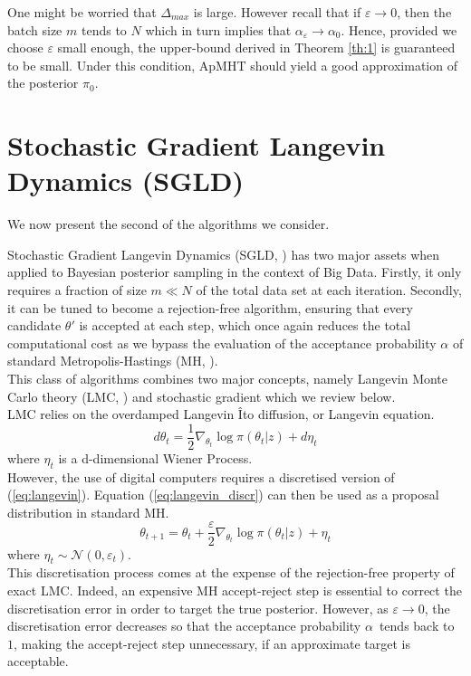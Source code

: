 \documentclass[11pt,a4paper]{report}\usepackage[]{graphicx}\usepackage[]{color}
\begin{document}
One might be worried that $\Delta_{max}$ is large. However recall that if $\varepsilon\rightarrow0$, then the batch size $m$ tends to $N$ which in turn implies that $\alpha_\varepsilon\rightarrow\alpha_0$. Hence, provided we choose $\varepsilon$ small enough, the upper-bound derived in Theorem \ref{th:1} is guaranteed to be small. Under this condition, ApMHT should yield a good approximation of the posterior $\pi_0$.
\newpage
\section{Stochastic Gradient Langevin Dynamics (SGLD)}
\label{sec:SGLD_exp}
We now present the second of the algorithms we consider.
\par Stochastic Gradient Langevin Dynamics (SGLD, \cite{welling2011bayesian}) has two major assets when applied to Bayesian posterior sampling in the context of Big Data. Firstly, it only requires a fraction of size $m\ll N$ of the total data set at each iteration. Secondly, it can be tuned to become a rejection-free algorithm, ensuring that every candidate $\theta'$ is accepted at each step, which once again reduces the total computational cost as we bypass the evaluation of the acceptance probability $\alpha$ of standard Metropolis-Hastings (MH, \cite{metropolis1953equation}).\\
This class of algorithms combines two major concepts, namely Langevin Monte Carlo theory (LMC, \cite{roberts1998optimal}) and stochastic gradient which we review below.\\
LMC relies on the overdamped Langevin \^Ito diffusion, or Langevin equation.
\begin{equation}
\label{eq:langevin}
d\theta_t=\frac 12\nabla_{\theta_t} \log\pi(\theta_t|z)+d\eta_t
\end{equation}
where $\eta_t$ is a d-dimensional Wiener Process.\\
However, the use of digital computers requires a discretised version of (\ref{eq:langevin}). Equation (\ref{eq:langevin_discr}) can then be used as a proposal distribution in standard MH.
\begin{equation}
\label{eq:langevin_discr}
\theta_{t+1}=\theta_t+\frac \varepsilon 2\nabla_{\theta_t} \log\pi(\theta_t|z)+\eta_t
\end{equation}
where $\eta_t\sim\mathcal N(0,\varepsilon_t)$. \\
This discretisation process comes at the expense of the rejection-free property of exact LMC. Indeed, an expensive MH accept-reject step is essential to correct the discretisation error in order to target the true posterior. However, as $\varepsilon\rightarrow0$, the discretisation error decreases so that the acceptance probability $\alpha$\ tends back to $1$, making the accept-reject step unnecessary, if an approximate target is acceptable.\\
\end{document}
